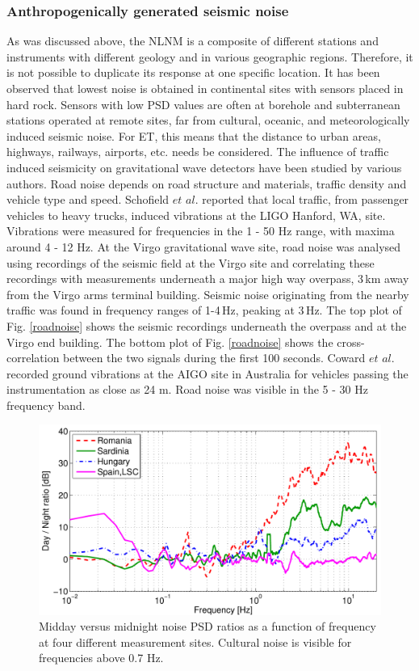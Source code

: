 \subsubsection*{Anthropogenically generated seismic noise}
As was discussed above, the NLNM is a composite of different stations and instruments with different geology and in various geographic regions. Therefore, it is not possible to duplicate its response at one specific location. It has been observed that lowest noise is obtained in continental sites with sensors placed in hard rock. Sensors with low PSD values are often at borehole and subterranean stations operated at remote sites, far from cultural, oceanic, and meteorologically induced seismic noise. For ET, this means that the distance to urban areas, highways, railways, airports, etc. needs be considered. The influence of traffic induced seismicity on gravitational wave detectors have been studied by various authors. Road noise depends on road structure and materials, traffic density and vehicle type and speed. Schofield $et$ $al.$ \cite{Schofield2000} reported that local traffic, from passenger vehicles to heavy trucks, induced vibrations at the LIGO Hanford, WA, site. Vibrations were measured for frequencies in the 1 - 50 Hz range, with maxima around 4 - 12 Hz. At the Virgo gravitational wave site, road noise was analysed using recordings of the seismic field at the Virgo site and correlating these recordings with measurements underneath a major high way overpass, 3\,km away from the Virgo arms terminal building. Seismic noise originating from the nearby traffic was found in frequency ranges of 1-4\,Hz, peaking at 3\,Hz. The top plot of Fig. \ref{roadnoise} shows the seismic recordings underneath the overpass and at the Virgo end building. The bottom plot of Fig. \ref{roadnoise} shows the cross-correlation between the two signals during the first 100 seconds.  Coward $et$ $al.$ \cite{Coward2003} recorded ground vibrations at the AIGO site in Australia for vehicles passing the instrumentation as close as 24 m. Road noise was visible in the 5 - 30 Hz frequency band.
\begin{figure}[t!]
	\begin{center}
		 \includegraphics[width=14cm]{./Sec_SiteInfra/Figures/DayNightRatio.pdf}
		\caption{Midday versus midnight noise PSD ratios as a function of frequency at four different measurement sites. Cultural noise is visible for frequencies above 0.7 Hz.}
			\label{fig3.3}
	\end{center}
\end{figure}

